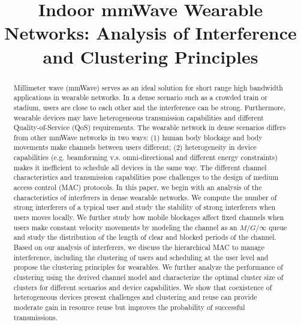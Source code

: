 \documentclass[10pt, conference, letterpaper]{IEEEtran}
\begin{document}
\title{Indoor mmWave Wearable Networks: Analysis of Interference and Clustering Principles}

\author{
}

\maketitle

\begin{abstract}
Millimeter wave (mmWave) serves as an ideal solution for short range high bandwidth applications in wearable networks. In a dense scenario such as a crowded train or stadium, users are close to each other and the interference can be strong. Furthermore, wearable devices may have heterogeneous transmission capabilities and different Quality-of-Service (QoS) requirements. The wearable network in dense scenarios differs from other mmWave networks in two ways: (1) human body blockage and body movements make channels between users different; (2) heterogeneity in device capabilities (e.g. beamforming v.s. omni-directional and different energy constraints) makes it inefficient to schedule all devices in the same way. The different channel characteristics and transmission capabilities pose challenges to the design of medium access control (MAC) protocols. In this paper, we begin with an analysis of the characteristics of interferers in dense wearable networks. We compute the number of strong interferers of a typical user and study the stability of strong interferers when users moves locally. We further study how mobile blockages affect fixed channels when users make constant velocity movements by modeling the channel as an $M/G/\infty$ queue and study the distribution of the length of clear and blocked periods of the channel. Based on our analysis of interferers, we discuss the hierarchical MAC to manage interference, including the clustering of users and scheduling at the user level and propose the clustering principles for wearables. We further analyze the performance of clustering using the derived channel model and characterize the optimal cluster size of clusters for different scenarios and device capabilities. We show that coexistence of heterogeneous devices present challenges and clustering and reuse can provide moderate gain in resource reuse but improves the probability of successful transmissions. 


\end{abstract}
\IEEEpeerreviewmaketitle
\end{document}
